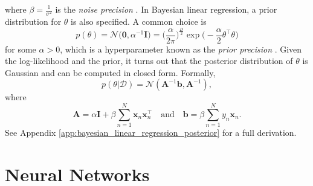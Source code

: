 \documentclass[msc,deptreport.inf]{infthesis} %
\newcommand{\matr}[1]{\mathbf{#1}}
\begin{document}
where $\beta = \frac{1}{\sigma^2}$ is the \emph{noise precision} \cite{barber2007}. In Bayesian linear regression, a prior distribution for $\theta$ is also specified. A common choice  is 
\begin{equation}\label{eqn:linear_regression_prior}
	p(\theta) 
	= \mathcal{N}\big(\matr{0}, \alpha^{-1} \matr{I} \big)
	= \Big(\frac{\alpha}{2\pi}\Big)^{\frac{D}{2}} \exp\Big(-\frac{\alpha}{2} \theta^\intercal \theta \Big)
\end{equation}
for some $\alpha > 0$, which is a hyperparameter known as the \emph{prior precision} \cite{barber2007}. Given the log-likelihood and the prior, it turns out that the posterior distribution of $\theta$ is Gaussian and can be computed in closed form. Formally, 
\begin{equation}\label{eqn:linear_regression_posterior}
	p(\theta | \mathcal{D}) = \mathcal{N}(\matr{A}^{-1} \matr{b}, \matr{A}^{-1}),
\end{equation}
where
\begin{equation}\label{eqn:linear_model_A_and_b}
	\matr{A} = \alpha \matr{I} + \beta \sum_{n=1}^N \matr{x}_n \matr{x}_n^\intercal
	\quad \text{and} \quad 
	\matr{b} = \beta \sum_{n=1}^N y_n \matr{x}_n.
\end{equation}
See Appendix \ref{app:bayesian_linear_regression_posterior} for a full derivation.


\section{Neural Networks}
\end{document}
